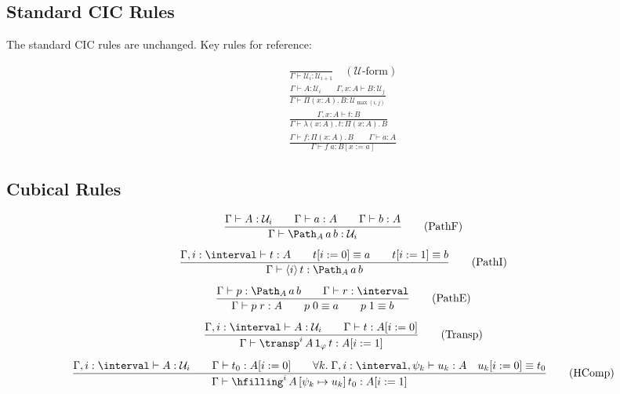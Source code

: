 \subsection{Standard CIC Rules}

The standard CIC rules are unchanged.  Key rules for reference:

\begin{gather}
\frac{}{\Gamma \vdash \mathcal{U}_i : \mathcal{U}_{i+1}}
\quad (\mathcal{U}\text{-form})
\tag{Univ}
\\[6pt]
\frac{\Gamma \vdash A : \mathcal{U}_i \qquad
      \Gamma, x : A \vdash B : \mathcal{U}_j}
     {\Gamma \vdash \Pi(x:A).\, B : \mathcal{U}_{\max(i,j)}}
\tag{$\Pi$F}
\\[6pt]
\frac{\Gamma, x : A \vdash t : B}
     {\Gamma \vdash \lambda(x:A).\, t : \Pi(x:A).\, B}
\tag{$\Pi$I}
\\[6pt]
\frac{\Gamma \vdash f : \Pi(x:A).\, B \qquad \Gamma \vdash a : A}
     {\Gamma \vdash f\; a : B[x := a]}
\tag{$\Pi$E}
\end{gather}

\subsection{Cubical Rules}

\begin{gather}
\frac{\Gamma \vdash A : \mathcal{U}_i \qquad
      \Gamma \vdash a : A \qquad \Gamma \vdash b : A}
     {\Gamma \vdash \Path_A\, a\, b : \mathcal{U}_i}
\tag{PathF}
\\[6pt]
\frac{\Gamma, i : \interval \vdash t : A \qquad
      t[i := 0] \equiv a \qquad t[i := 1] \equiv b}
     {\Gamma \vdash \langle i \rangle\, t : \Path_A\, a\, b}
\tag{PathI}
\\[6pt]
\frac{\Gamma \vdash p : \Path_A\, a\, b \qquad
      \Gamma \vdash r : \interval}
     {\Gamma \vdash p\; r : A \qquad p\; 0 \equiv a \qquad p\; 1 \equiv b}
\tag{PathE}
\\[6pt]
\frac{\Gamma, i : \interval \vdash A : \mathcal{U}_i \qquad
      \Gamma \vdash t : A[i := 0]}
     {\Gamma \vdash \transp^i\, A\, \mathsf{1}_\varphi\, t : A[i := 1]}
\tag{Transp}
\\[6pt]
\frac{
  \Gamma, i : \interval \vdash A : \mathcal{U}_i
  \qquad
  \Gamma \vdash t_0 : A[i := 0]
  \qquad
  \forall k.\;
  \Gamma, i : \interval, \psi_k \vdash u_k : A
  \quad
  u_k[i := 0] \equiv t_0
}
{
  \Gamma \vdash \hfilling^i\, A\, [\psi_k \mapsto u_k]\, t_0
  : A[i := 1]
}
\tag{HComp}
\end{gather}

